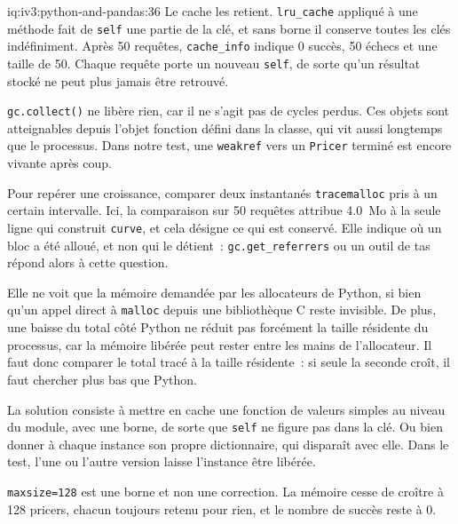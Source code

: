 \begin{solution}{iq:iv3:python-and-pandas:36}
Le cache les retient. \texttt{lru\_cache} appliqué à une méthode fait de \texttt{self} une partie de la clé, et sans borne il conserve toutes les clés indéfiniment. Après 50 requêtes, \texttt{cache\_info} indique 0 succès, 50 échecs et une taille de 50. Chaque requête porte un nouveau \texttt{self}, de sorte qu'un résultat stocké ne peut plus jamais être retrouvé.

\texttt{gc.collect()} ne libère rien, car il ne s'agit pas de cycles perdus. Ces objets sont atteignables depuis l'objet fonction défini dans la classe, qui vit aussi longtemps que le processus. Dans notre test, une \texttt{weakref} vers un \texttt{Pricer} terminé est encore vivante après coup.

Pour repérer une croissance, comparer deux instantanés \texttt{tracemalloc} pris à un certain intervalle. Ici, la comparaison sur 50 requêtes attribue 4.0~Mo à la seule ligne qui construit \texttt{curve}, et cela désigne ce qui est conservé. Elle indique où un bloc a été alloué, et non qui le détient~: \texttt{gc.get\_referrers} ou un outil de tas répond alors à cette question.

Elle ne voit que la mémoire demandée par les allocateurs de Python, si bien qu'un appel direct à \texttt{malloc} depuis une bibliothèque C reste invisible. De plus, une baisse du total côté Python ne réduit pas forcément la taille résidente du processus, car la mémoire libérée peut rester entre les mains de l'allocateur. Il faut donc comparer le total tracé à la taille résidente~: si seule la seconde croît, il faut chercher plus bas que Python.

La solution consiste à mettre en cache une fonction de valeurs simples au niveau du module, avec une borne, de sorte que \texttt{self} ne figure pas dans la clé. Ou bien donner à chaque instance son propre dictionnaire, qui disparaît avec elle. Dans le test, l'une ou l'autre version laisse l'instance être libérée.

\texttt{maxsize=128} est une borne et non une correction. La mémoire cesse de croître à 128 pricers, chacun toujours retenu pour rien, et le nombre de succès reste à 0.

\end{solution}

